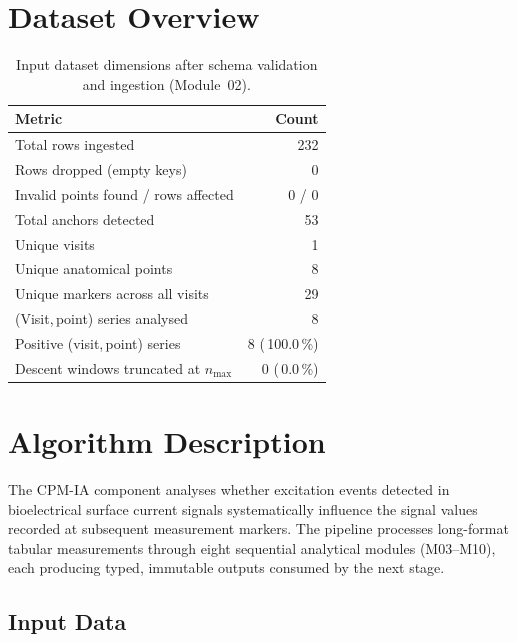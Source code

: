 \documentclass[a4paper,11pt]{article}
\begin{document}
\section{Dataset Overview}

\begin{table}[h!]
\centering
\small
\caption{Input dataset dimensions after schema validation and ingestion (Module~02).}
\begin{tabular}{lr}
\toprule
\textbf{Metric} & \textbf{Count} \\
\midrule
Total rows ingested                        & 232 \\
Rows dropped (empty keys)                  & 0 \\
Invalid points found / rows affected       & 0 / 0 \\
Total anchors detected                     & 53 \\
Unique visits                          & 1 \\
Unique anatomical points               & 8 \\
Unique markers across all visits       & 29 \\
(Visit,\,point) series analysed        & 8 \\
Positive (visit,\,point) series        & 8 (\,100.0\,\%) \\
Descent windows truncated at $n_{\max}$ & 0 (\,0.0\,\%) \\
\bottomrule
\end{tabular}
\end{table}

\section{Algorithm Description}

The CPM-IA component analyses whether excitation events detected in bioelectrical surface
current signals systematically influence the signal values recorded at subsequent measurement
markers. The pipeline processes long-format tabular measurements through eight sequential
analytical modules (M03--M10), each producing typed, immutable outputs consumed by the next
stage.

\subsection{Input Data}
\end{document}
